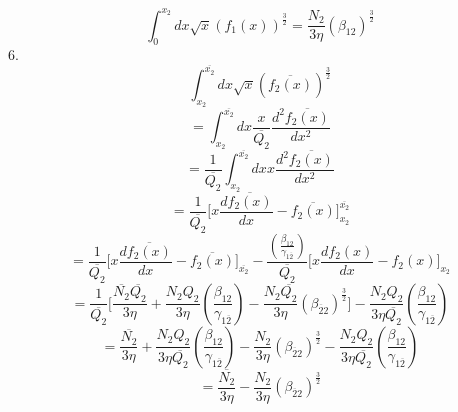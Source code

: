 \documentclass[fleqn, 10pt]{article}
\begin{document}
 \begin{equation}
     \int^{x_{2}}_0 dx \sqrt{x} (f_1(x))^\frac{3}{2} = \frac{N_{2}}{3 \eta} (\beta_{12})^\frac{3}{2}
     \label{90}
 \end{equation}
 6.  \begin{equation*}
     \int^{\overline{x_{2}}}_{x_{2}} dx \sqrt{x} (\overline{f_{2}(x)})^\frac{3}{2}
 \end{equation*}
 \begin{equation*}
     = \int^{\overline{x_{2}}}_{x_{2}} dx \frac{x}{\overline{Q_{2}}} \frac{d^2\overline{f_{2}(x)}}{dx^2}
 \end{equation*}
 \begin{equation*}
      = \frac{1}{\overline{Q_{2}}} \int^{\overline{x_{2}}}_{x_{2}} dx x \frac{d^2\overline{f_{2}(x)}}{dx^2}
 \end{equation*}
 \begin{equation*}
     = \frac{1}{\overline{Q_{2}}} \biggl[ x \frac{d\overline{f_{2}(x)}}{dx} - \overline{f_{2}(x)} \biggr]^{\overline{x_{2}}}_{x_{2}}
 \end{equation*}
 \begin{equation*}
     = \frac{1}{\overline{Q_{2}}} \biggl[x \frac{d\overline{f_{2}(x)}}{dx} - \overline{f_{2}(x)} \biggr]_{\overline{x_{2}}} - \frac{\left(\frac{\beta_{12}}{\gamma_{1\overline{2}}}\right)}{\overline{Q_{2}}} \biggl[x\frac{df_{2}(x)}{dx} - f_{2}(x) \biggr]_{x_{2}}
 \end{equation*}
 \begin{equation*}
     = \frac{1}{\overline{Q_{2}}} \biggl[ \frac{\overline{N_{2}}\overline{Q_{2}}}{3 \eta} + \frac{N_{2} Q_{2}}{3 \eta} \left(\frac{\beta_{12}}{\gamma_{1\overline{2}}}\right) - \frac{N_{2} \overline{Q_{2}}}{3 \eta} (\beta_{\overline{2}2})^\frac{3}{2} \biggr] - \frac{N_{2} Q_{2}}{3 \eta \overline{Q_{2}}}\left(\frac{\beta_{12}}{\gamma_{1\overline{2}}}\right) 
 \end{equation*}
 \begin{equation*}
     = \frac{\overline{N_{2}}}{3 \eta} + \frac{N_{2} Q_{2}}{3 \eta \overline{Q_{2}}} \left(\frac{\beta_{12}}{\gamma_{1\overline{2}}}\right) - \frac{N_{2}}{3 \eta} (\beta_{\overline{2}2})^\frac{3}{2} - \frac{N_{2}Q_{2}}{3 \eta \overline{Q_{2}}} \left(\frac{\beta_{12}}{\gamma_{1\overline{2}}}\right)
 \end{equation*}
 \begin{equation}
     = \frac{\overline{N_{2}}}{3 \eta} - \frac{N_{2}}{3 \eta} (\beta_{\overline{2}2})^\frac{3}{2}
     \label{91}
 \end{equation}        
\end{document}
